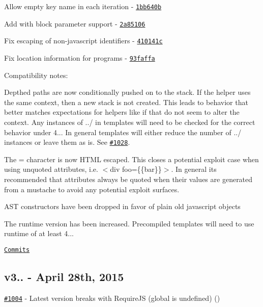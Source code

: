 \begin{DoxyItemize}
\item Allow empty key name in each iteration -\/ \href{https://github.com/wycats/handlebars.js/commit/1bb640b}{\tt 1bb640b}
\item Add with block parameter support -\/ \href{https://github.com/wycats/handlebars.js/commit/2a85106}{\tt 2a85106}
\item Fix escaping of non-\/javascript identifiers -\/ \href{https://github.com/wycats/handlebars.js/commit/410141c}{\tt 410141c}
\item Fix location information for programs -\/ \href{https://github.com/wycats/handlebars.js/commit/93faffa}{\tt 93faffa}
\end{DoxyItemize}

Compatibility notes\+:
\begin{DoxyItemize}
\item Depthed paths are now conditionally pushed on to the stack. If the helper uses the same context, then a new stack is not created. This leads to behavior that better matches expectations for helpers like {\ttfamily if} that do not seem to alter the context. Any instances of {\ttfamily ../} in templates will need to be checked for the correct behavior under 4... In general templates will either reduce the number of {\ttfamily ../} instances or leave them as is. See \href{https://github.com/wycats/handlebars.js/issues/1028}{\tt \#1028}.
\item The {\ttfamily =} character is now H\+T\+M\+L escaped. This closes a potential exploit case when using unquoted attributes, i.\+e. {\ttfamily $<$div foo=\{\{bar\}\}$>$}. In general it\textquotesingle{}s recommended that attributes always be quoted when their values are generated from a mustache to avoid any potential exploit surfaces.
\item A\+S\+T constructors have been dropped in favor of plain old javascript objects
\item The runtime version has been increased. Precompiled templates will need to use runtime of at least 4...
\end{DoxyItemize}

\href{https://github.com/wycats/handlebars.js/compare/v3.0.3...v4.0.0}{\tt Commits}

\subsection*{v3.. -\/ April 28th, 2015}


\begin{DoxyItemize}
\item \href{https://github.com/wycats/handlebars.js/issues/1004}{\tt \#1004} -\/ Latest version breaks with Require\+J\+S (global is undefined) (\href{https://api.github.com/users/boskee}{\tt })
\end{DoxyItemize}

